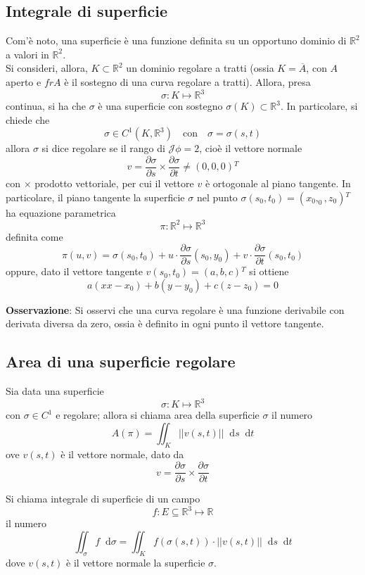 \documentclass[a4paper]{extarticle}
\newcommand*\dif{\mathop{}\!\mathrm{d}}
\begin{document}
\subsection{Integrale di superficie}
Com'è noto, una superficie è una funzione definita su un opportuno dominio di $\mathbb{R}^2$ a valori in $\mathbb{R}^2$.\\
Si consideri, allora, $K \subset \mathbb{R}^2$ un dominio regolare a tratti (ossia $K=\overline{A}$, con $A$ aperto e $fr A$ è il sostegno di una curva regolare a tratti). Allora, presa
\[\sigma : K \longmapsto \mathbb{R}^3\]
continua, si ha che $\sigma$ è una superficie con sostegno $\sigma(K) \subset \mathbb{R}^3$. In particolare, si chiede che
\[\sigma \in C^1(K,\mathbb{R}^3) \hspace{1em} \text{con} \hspace{1em} \sigma=\sigma(s,t)\]
allora $\sigma$ si dice regolare se il rango di $\mathcal{J} \phi = 2$, cioè il vettore normale
\[v = \frac{\partial \sigma}{\partial s} \times \frac{\partial \sigma}{\partial t} \neq (0,0,0){^T}\]
con $\times$ prodotto vettoriale, per cui il vettore $v$ è ortogonale al piano tangente. In particolare, il piano tangente la superficie $\sigma$ nel punto $\sigma(s_0,t_0) = (x_0,_0,z_0){^T}$ ha equazione parametrica
\[\pi : \mathbb{R}^2 \longmapsto \mathbb{R}^3\]
definita come
\[\pi(u,v) = \sigma(s_0,t_0) + u \cdot \frac{\partial \sigma}{\partial s} (s_0,y_0) + v \cdot \frac{\partial \sigma}{\partial t}(s_0,t_0)\]
oppure, dato il vettore tangente $v(s_0,t_0)=(a,b,c){^T}$ si ottiene
\[a(xx-x_0)+b(y-y_0)+c(z-z_0)=0\]

\vspace{1em}
\noindent
\textbf{Osservazione}: Si osservi che una curva regolare è una funzione derivabile con derivata diversa da zero, ossia è definito in ogni punto il vettore tangente.

\vspace{1em}
\noindent
\subsection{Area di una superficie regolare}
Sia data una superficie
\[\sigma : K \longmapsto \mathbb{R}^3\]
con $\sigma \in C^1$ e regolare; allora si chiama area della superficie $\sigma$ il numero
\[A(\pi) = \iint_K \left\vert\left\vert v(s,t) \right\vert\right\vert \dif s \dif t\]
ove $v(s,t)$ è il vettore normale, dato da
\[v=\frac{\partial \sigma}{\partial s} \times \frac{\partial \sigma}{\partial t}\]

\vspace{1em}
\noindent
Si chiama integrale di superficie di un campo
\[f : E \subseteq \mathbb{R}^3 \longmapsto \mathbb{R}\]
il numero
\[\iint_\sigma f \dif \sigma = \iint_K f(\sigma(s,t)) \cdot \left\vert\left\vert v(s,t) \right\vert\right\vert \dif s \dif t\]
dove $v(s,t)$ è il vettore normale la superficie $\sigma$.
\end{document}
